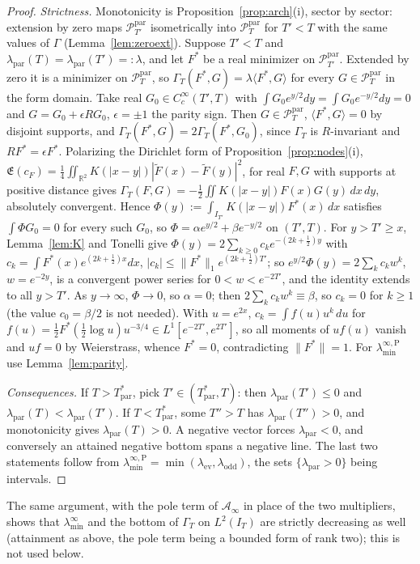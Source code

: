\documentclass[11pt]{amsart}
\theoremstyle{definition}
\theoremstyle{remark}
\newcommand{\R}{\mathbb R}
\newcommand{\PT}{\mathcal P_T}
\newcommand{\IT}{I_T}
\newcommand{\cF}{c_F}
\newcommand{\Lev}{\mathfrak E}
\newcommand{\Ainf}{\mathcal A_\infty}
\newcommand{\laminf}{\lambda^{\infty}_{\min}}
\newcommand{\laminfP}{\lambda^{\infty,\mathrm P}_{\min}}
\begin{document}
\begin{proof}
\emph{Strictness.} Monotonicity is Proposition~\ref{prop:arch}(i), sector by sector: extension by zero
maps $\mathcal P^{\mathrm{par}}_{T'}$ isometrically into $\PT^{\mathrm{par}}$ for $T'<T$ with the same
values of $\Gamma$ (Lemma~\ref{lem:zeroext}). Suppose $T'<T$ and
$\lambda_{\mathrm{par}}(T)=\lambda_{\mathrm{par}}(T')=:\lambda$, and let $F^*$ be a real minimizer on
$\mathcal P^{\mathrm{par}}_{T'}$. Extended by zero it is a minimizer on $\PT^{\mathrm{par}}$, so
$\Gamma_T(F^*,G)=\lambda\langle F^*,G\rangle$ for every $G\in\PT^{\mathrm{par}}$ in the form domain. Take
real $G_0\in C_c^\infty(T',T)$ with $\int G_0e^{y/2}dy=\int G_0e^{-y/2}dy=0$ and $G=G_0+\epsilon RG_0$,
$\epsilon=\pm1$ the parity sign. Then $G\in\PT^{\mathrm{par}}$, $\langle F^*,G\rangle=0$ by disjoint
supports, and $\Gamma_T(F^*,G)=2\Gamma_T(F^*,G_0)$, since $\Gamma_T$ is $R$-invariant and
$RF^*=\epsilon F^*$. Polarizing the Dirichlet form of Proposition~\ref{prop:nodes}(i),
$\Lev(\cF)=\frac14\iint_{\R^2}K(|x-y|)|\widetilde F(x)-\widetilde F(y)|^2$, for real $F,G$ with
supports at positive distance gives
$\Gamma_T(F,G)=-\frac12\iint K(|x-y|)F(x)G(y)\,dx\,dy$, absolutely convergent. Hence
$\Phi(y):=\int_{I_{T'}}K(|x-y|)F^*(x)\,dx$ satisfies $\int\Phi G_0=0$ for every such $G_0$, so
$\Phi=\alpha e^{y/2}+\beta e^{-y/2}$ on $(T',T)$. For $y>T'\ge x$, Lemma~\ref{lem:K} and Tonelli give
$\Phi(y)=2\sum_{k\ge0}c_ke^{-(2k+\frac12)y}$ with $c_k=\int F^*(x)e^{(2k+\frac12)x}dx$,
$|c_k|\le\|F^*\|_1e^{(2k+\frac12)T'}$; so $e^{y/2}\Phi(y)=2\sum_kc_kw^k$, $w=e^{-2y}$, is a convergent
power series for $0<w<e^{-2T'}$, and the identity extends to all $y>T'$. As $y\to\infty$, $\Phi\to0$,
so $\alpha=0$; then $2\sum_kc_kw^k\equiv\beta$, so $c_k=0$ for $k\ge1$ (the value $c_0=\beta/2$ is not
needed). With $u=e^{2x}$, $c_k=\int f(u)u^k\,du$ for
$f(u)=\frac12F^*(\frac12\log u)u^{-3/4}\in L^1[e^{-2T'},e^{2T'}]$, so all moments of $uf(u)$ vanish and
$uf=0$ by Weierstrass, whence $F^*=0$, contradicting $\|F^*\|=1$. For $\laminfP$ use Lemma~\ref{lem:parity}.

\emph{Consequences.} If $T>T^*_{\mathrm{par}}$, pick $T'\in(T^*_{\mathrm{par}},T)$: then
$\lambda_{\mathrm{par}}(T')\le0$ and $\lambda_{\mathrm{par}}(T)<\lambda_{\mathrm{par}}(T')$. If
$T<T^*_{\mathrm{par}}$, some $T''>T$ has $\lambda_{\mathrm{par}}(T'')>0$, and monotonicity gives
$\lambda_{\mathrm{par}}(T)>0$. A negative vector forces $\lambda_{\mathrm{par}}<0$, and conversely an
attained negative bottom spans a negative line. The last two statements follow from
$\laminfP=\min(\lambda_{\mathrm{ev}},\lambda_{\mathrm{odd}})$, the sets $\{\lambda_{\mathrm{par}}>0\}$ being
intervals.
\end{proof}
The same argument, with the pole term of $\Ainf$ in place of the two multipliers, shows that $\laminf$
and the bottom of $\Gamma_T$ on $L^2(\IT)$ are strictly decreasing as well (attainment as above, the pole
term being a bounded form of rank two); this is not used below.
\end{document}

